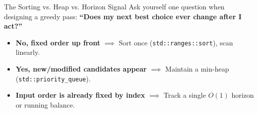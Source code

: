 \documentclass[11pt,a4paper]{article}
\theoremstyle{definition}
\begin{document}
\begin{calloutbox}{The Sorting vs. Heap vs. Horizon Signal}
Ask yourself one question when designing a greedy pass: \textbf{``Does my next best choice ever change after I act?''}
\begin{itemize}[itemsep=2pt, topsep=2pt]
    \item \textbf{No, fixed order up front} $\implies$ Sort once (\texttt{std::ranges::sort}), scan linearly.
    \item \textbf{Yes, new/modified candidates appear} $\implies$ Maintain a min-heap (\texttt{std::priority\_queue}).
    \item \textbf{Input order is already fixed by index} $\implies$ Track a single $O(1)$ horizon or running balance.
\end{itemize}
\end{calloutbox}
\end{document}
